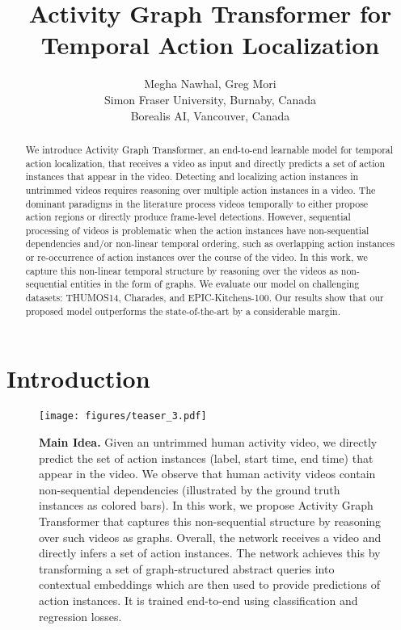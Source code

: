 \documentclass[10pt,twocolumn,letterpaper]{article}
\begin{document}
\title{Activity Graph Transformer for Temporal Action Localization}

\author{Megha Nawhal, Greg Mori\\
 Simon Fraser University, Burnaby, Canada\\
 Borealis AI, Vancouver, Canada\\
}

\maketitle
\thispagestyle{empty}



\begin{abstract}
We introduce Activity Graph Transformer, an end-to-end learnable model for temporal action localization, that receives a video as input and directly predicts a set of action instances that appear in the video.
Detecting and localizing action instances in untrimmed videos requires reasoning over multiple action instances in a video. The dominant paradigms in the literature process videos temporally to either propose action regions or directly produce frame-level detections. However, sequential processing of videos is problematic when the action instances have non-sequential dependencies and/or non-linear temporal ordering, such as overlapping action instances or re-occurrence of action instances over the course of the video. In this work, we capture this non-linear temporal structure by reasoning over the videos as non-sequential entities in the form of graphs.  We evaluate our model on challenging datasets: THUMOS14, Charades, and EPIC-Kitchens-100. Our results show that our proposed model outperforms the state-of-the-art by a considerable margin.

\end{abstract}


\section{Introduction}






\begin{figure}[t]
    \centering
    \texttt{[image: figures/teaser\_3.pdf]}
    \caption{\textbf{Main Idea.} Given an untrimmed human activity video, we directly predict the set of action instances (label, start time, end time) that appear in the video. We observe that human activity videos contain non-sequential dependencies (illustrated by the ground truth instances as colored bars). In this work, we propose Activity Graph Transformer that captures this non-sequential structure by reasoning over such videos as graphs. Overall, the network receives a video and directly infers a set of action instances. The network achieves this by transforming a set of graph-structured abstract queries into contextual embeddings which are then used to provide predictions of action instances. It is trained end-to-end using classification and regression losses. }
    \label{fig:teaser}
\end{figure}
\end{document}
